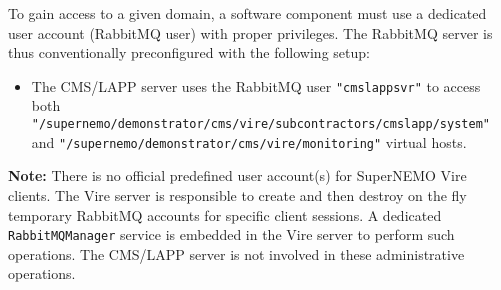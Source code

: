 
To gain  access to  a given  domain, a software  component must  use a
dedicated user  account (RabbitMQ  user) with proper  privileges.  The
RabbitMQ  server   is  thus  conventionally  preconfigured   with  the
following setup:

\begin{itemize}


\item The CMS/LAPP server uses the RabbitMQ user \texttt{"cmslappsvr"}
  to  access  both   \\
  \texttt{"/supernemo/demonstrator/cms/vire/subcontractors/cmslapp/system"}  and
  \texttt{"/supernemo/demonstrator/cms/vire/monitoring"} virtual hosts.

\end{itemize}

\noindent  \textbf{Note:}   There  is  no  official   predefined  user
account(s) for SuperNEMO Vire clients.  The Vire server is responsible
to create and then destroy on  the fly temporary RabbitMQ accounts for
specific  client  sessions.  A  dedicated  \texttt{RabbitMQManager}
service is embedded in the Vire server to perform such operations. The
CMS/LAPP server is not involved in these administrative operations.


\vfill
\afterpage{\clearpage}
\pagebreak
